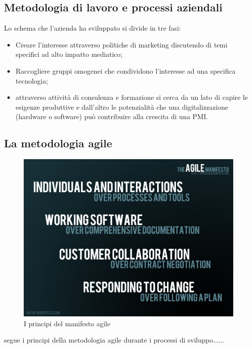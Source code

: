 \subsection{Metodologia di lavoro e processi aziendali}
Lo schema che l'azienda ha sviluppato si divide in tre fasi:
\begin{itemize}
\item Creare l’interesse attraverso politiche di marketing discutendo di temi specifici ad alto impatto mediatico;
\item Raccogliere gruppi omogenei che condividono l'interesse ad una specifica tecnologia;
\item attraverso attività di consulenza e formazione si cerca da un lato di capire le esigenze produttive e dall’altro le potenzialità che una digitalizzazione (hardware o software) può contribuire alla crescita di una PMI.
\end{itemize}

\subsection{La metodologia agile}
\begin{figure}[H]
	\begin{center}
	\includegraphics[scale=0.25]{immagini/agile_manifesto.jpg}
	\caption{I principi del manifesto agile}
	\end{center}
\end{figure}
\lab{} segue i principi della metodologia agile durante i processi di sviluppo......


